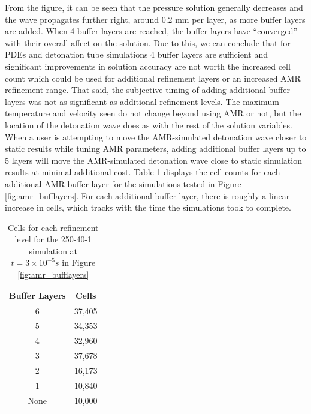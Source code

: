 \noindent From the figure, it can be seen that the pressure solution generally decreases and the wave propagates further right, around 0.2 mm per layer, as more buffer layers are added. When 4 buffer layers are reached, the buffer layers have ``converged'' with their overall affect on the solution. Due to this, we can conclude that for PDEs and detonation tube simulations 4 buffer layers are sufficient and significant improvements in solution accuracy are not worth the increased cell count which could be used for additional refinement layers or an increased AMR refinement range. That said, the subjective timing of adding additional buffer layers was not as significant as additional refinement levels. The maximum temperature and velocity seen do not change beyond using AMR or not, but the location of the detonation wave does as with the rest of the solution variables. When a user is attempting to move the AMR-simulated detonation wave closer to static results while tuning AMR parameters, adding additional buffer layers up to 5 layers will move the AMR-simulated detonation wave close to static simulation results at minimal additional cost. Table \ref{tab:amr_bufflayers} displays the cell counts for each additional AMR buffer layer for the simulations tested in Figure \ref{fig:amr_bufflayers}. For each additional buffer layer, there is roughly a linear increase in cells, which tracks with the time the simulations took to complete. 

\begin{table}
\centering
\caption{Cells for each refinement level for the 250-40-1 simulation at \(t = 3\times 10^{ - 5} s\) in Figure \ref{fig:amr_bufflayers}}
\label{tab:amr_bufflayers}
\begin{tabular}{cc}
Buffer Layers & Cells \\ \hline
6 & 37,405 \\ 
5 & 34,353 \\
4 & 32,960 \\
3 & 37,678 \\
2 & 16,173 \\
1 & 10,840 \\
None & 10,000 \\
\end{tabular}
\end{table}


